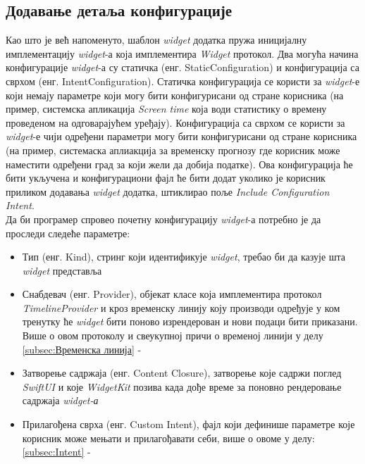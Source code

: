 \documentclass[12pt,oneside]{memoir}
\begin{document}
\subsection{Додавање детаља конфигурације}
\indent Као што је већ напоменуто, шаблон \textit{widget} додатка пружа иницијалну имплементацију \textit{widget}-а која имплементира \textit{Widget} протокол. Два могућа начина конфигурације \textit{widget}-а су статичка (енг. StaticConfiguration) и конфигурација са сврхом (енг. IntentConfiguration).
\indent Статичка конфигурација се користи за \textit{widget}-е који немају параметре који могу бити конфигурисани од стране корисника (на пример, системска апликација \textit{Screen time} која води статистику о времену проведеном на одговарајућем уређају).
\indent Конфигурација са сврхом се користи за \textit{widget}-е чији одређени параметри могу бити конфигурисани од стране корисника (на пример, системаска аплиакција за временску прогнозу где корисник може наместити одређени град за који жели да добија податке). Ова конфигурација ће бити укључена и конфигурациони фајл ће бити додат уколико је корисник приликом додавања \textit{widget} додатка, штиклирао поље \textit{Include Configuration Intent}.
\\
\indent Да би програмер спровео почетну конфигурацију \textit{widget}-а потребно је да проследи следеће параметре:
\begin{itemize}
    \item Тип (енг. Kind), стринг који идентификује \textit{widget}, требао би да казује шта \textit{widget} представља
    \item Снабдевач (енг. Provider), објекат класе која имплементира протокол \textit{TimelineProvider} и кроз временску линију коју производи одређује у ком тренутку ће \textit{widget} бити поново изрендерован и нови подаци бити приказани. Више о овом протоколу и свеукупној причи о временој линији у делу \ref{subsec:Временска линија} - 
    \item Затворење садржаја (енг. Content Closure), затворење које садржи поглед \textit{SwiftUI} и које \textit{WidgetKit} позива када дође време за поновно рендеровање садржаја \textit{widget-а}
    \item Прилагођена сврха (енг. Custom Intent), фајл који дефинише параметре које корисник може мењати и прилагођавати себи, више о овоме у делу: \ref{subsec:Intent} - 
\end{itemize}
\end{document}
